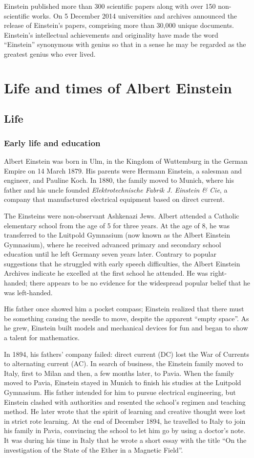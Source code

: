 \documentclass[twoside]{report}
\begin{document}
Einstein published more than 300 scientific papers along with over
150 non-scientific works. On 5 December 2014 universities and
archives announced the release of Einstein's papers, comprising more
than 30,000 unique documents. Einstein's intellectual achievements and
originality have made the word ``Einstein'' synonymous with genius so
that in a sense he may be regarded as the greatest genius who ever lived.

\chapter[Life]{Life and times of Albert Einstein}
\section{Life}
\subsection{Early life and education}

Albert Einstein was born in Ulm, in the Kingdom of Wuttemburg in
the German Empire on 14 March 1879. His parents were Hermann Einstein,
a salesman and engineer, and Pauline Koch. In 1880, the family moved
to Munich, where his father and his uncle founded
\emph{Elektrotechnische Fabrik J. Einstein \& Cie}, a company that
manufactured electrical equipment based on direct current.

The Einsteins were non-observant Ashkenazi Jews. Albert attended a
Catholic elementary school from the age of 5 for three years. At the
age of 8, he was transferred to the Luitpold Gymnasium (now known as
the Albert Einstein Gymnasium), where he received advanced primary and
secondary school education until he left Germany seven years later.
Contrary to popular suggestions that he struggled with early speech
difficulties, the Albert Einstein Archives indicate he excelled at
the first school he attended. He was right-handed; there appears to
be no evidence for the widespread popular belief that he was left-handed.

His father once showed him a pocket compass; Einstein realized that
there must be something causing the needle to move, despite the apparent
``empty space''. As he grew, Einstein built models and mechanical devices
for fun and began to show a talent for mathematics.

In 1894, his fathers' company failed: direct current (DC) lost the War of
Currents to alternating current (AC). In search of business, the Einstein
family moved to Italy, first to Milan and then, a few months later, to Pavia.
When the family moved to Pavia, Einstein stayed in Munich to finish his
studies at the Luitpold Gymnasium. His father intended for him to pursue
electrical engineering, but Einstein clashed with authorities and resented
the school's regimen and teaching method. He later wrote that the spirit of
learning and creative thought were lost in strict rote learning. At the end
of December 1894, he travelled to Italy to join his family in Pavia,
convincing the school to let him go by using a doctor's note. It was during
his time in Italy that he wrote a short essay with the title ``On the
investigation of the State of the Ether in a Magnetic Field''.
\end{document}
